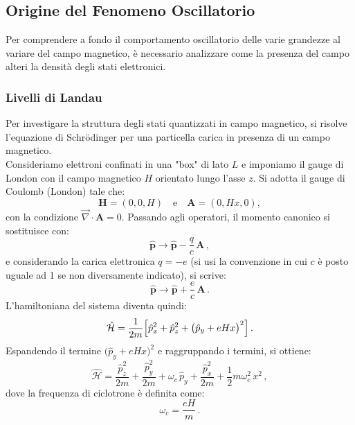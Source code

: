 \subsection{Origine del Fenomeno Oscillatorio}
Per comprendere a fondo il comportamento oscillatorio delle varie grandezze al variare del campo magnetico, è necessario analizzare come la presenza del campo alteri la densità degli stati elettronici.

\subsubsection{Livelli di Landau}

Per investigare la struttura degli stati quantizzati in campo magnetico, si risolve l'equazione di Schrödinger per una particella carica in presenza di un campo magnetico.  \\
Consideriamo elettroni confinati in una "box" di lato \(L\) e imponiamo il gauge di London con il campo magnetico \(H\) orientato lungo l'asse \(z\).  
Si adotta il gauge di Coulomb (London) tale che:
\[
\mathbf{H}=(0,0,H) \quad \text{e} \quad \mathbf{A}=(0,Hx,0),
\]
con la condizione \(\vec{\nabla} \cdot \mathbf{A}=0\).  
Passando agli operatori, il momento canonico si sostituisce con:
\[
\hat{\mathbf{p}} \to \hat{\mathbf{p}} - \frac{q}{c}\,\mathbf{A}\,,
\]
e considerando la carica elettronica \(q = -e\) (si usi la convenzione in cui \(c\) è posto uguale ad 1 se non diversamente indicato), si scrive:
\[
\hat{\mathbf{p}} \to \hat{\mathbf{p}} + \frac{e}{c}\,\mathbf{A}\,.
\]
L'hamiltoniana del sistema diventa quindi:
\[
\hat{\mathcal{H}} = \frac{1}{2m}\Bigl[\hat{p}_x^2 + \hat{p}_z^2 + \bigl(\hat{p}_y+eHx\bigr)^2\Bigr]\,.
\]
Espandendo il termine \(\bigl(\hat{p}_y+eHx\bigr)^2\) e raggruppando i termini, si ottiene:
\[
\hat{\mathcal{H}} = \frac{\hat{p}_z^2}{2m} + \frac{\hat{p}_y^2}{2m} + \omega_c\, \hat{p}_y + \frac{\hat{p}_x^2}{2m} + \frac{1}{2}m\omega_c^2\, x^2\,,
\]
dove la frequenza di ciclotrone è definita come:
\[
\omega_c = \frac{eH}{m}\,.
\]

